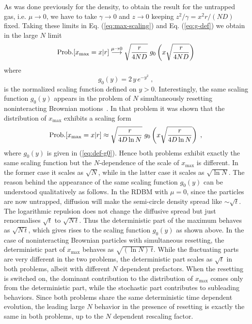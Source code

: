 \documentclass[onecolumn,superscriptaddress,
 amsmath,amssymb,
 aps,
 prd,
]{revtex4-1}
\begin{document}
\vspace*{0.3cm}
 As was done previously for the density, to obtain the result for the untrapped gas, i.e. $\mu \to 0$, we have to take $\gamma \to 0$ and $z \to 0$ keeping $z^2 / \gamma = x^2 r  / (N D)$ fixed. Taking these limits in Eq. (\ref{eq:max-scaling}) and Eq. (\ref{eq:g-def}) we obtain in the large $N$ limit
\begin{equation} \label{eq:evs-mu0}
{\rm Prob.}[x_{\rm max} = x | r] \stackrel{\mu \to 0}{\longrightarrow} \sqrt{\frac{r}{4 N D}} \; g_0\left(x \sqrt{\frac{r}{4 N D}} \right) 
\end{equation}
where
\begin{equation} \label{eq:def-g0}
g_0\left(y \right) = 2 \, y \, e^{-y^2} \;,
\end{equation}
is the normalized scaling function defined on $y > 0$. Interestingly, the same scaling function $g_0(y)$ appears in the problem of $N$ simultaneously resetting noninteracting Brownian motions~\cite{BLMS23}. In that problem it was shown that the distribution of $x_{\max}$ exhibits a scaling form 
 \begin{equation} \label{eq:evs_inde}
{\rm Prob.}[x_{\rm max} = x | r] \approx \sqrt{\frac{r}{4  D \ln N}} \; g_0\left(x \sqrt{\frac{r}{4 D \ln N}} \right) \;,
\end{equation}
where $g_0(y)$ is given in (\ref{eq:def-g0}). Hence both problems exhibit exactly the same scaling function but the $N$-dependence of the 
scale of $x_{\max}$ is different. In the former case it scales as $\sqrt{N}$, while in the latter case it scales as $\sqrt{\ln N}$. The reason behind the appearance
of the same scaling function $g_0(y)$ can be understood qualitatively as follows. In the RDBM with $\mu = 0$, since the 
particles are now untrapped, diffusion will make the semi-circle density spread like $\sim \sqrt{t}$. The logarithmic repulsion does not change the diffusive spread but just renormalises $\sqrt{t}$ to $\sqrt{N \, t}$. Thus the deterministic part of the maximum behaves as $\sqrt{N\,t}$, which gives rises to the scaling function $g_0(y)$ as shown above. In the case of noninteracting Brownian particles with simultaneous resetting, the deterministic part of $x_{\max}$ behaves as $\sqrt{(\ln N)\,t}$. While the fluctuating parts are very different in the two problems, the deterministic part scales as $\sqrt{t}$ in both problems, albeit with different $N$ dependent prefactors. When the resetting is switched on, the dominant contribution to the distribution of $x_{\max}$ comes only from the deterministic part,   
while the stochastic part contributes to subleading behaviors. Since both problems share the same deterministic time dependent evolution, the leading large $N$ behavior in the presence of resetting is exactly the same in both problems, up to the $N$ dependent rescaling factor.  
\end{document}
